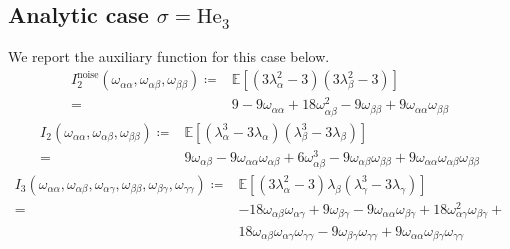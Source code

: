 \subsection{Analytic case \texorpdfstring{$\sigma = \text{He}_3$}{sigma = He3}}
\label{2406:sec:app:theory_H3}
We report the auxiliary function for this case below. 
\[\begin{split}
I^\text{noise}_2(\omega_{\alpha\alpha},\omega_{\alpha\beta},\omega_{\beta\beta}) \coloneqq& \mathbb E \left[(3\lambda_\alpha^2-3)(3\lambda_\beta^2-3)\right] \\
=& 9 - 9\omega_{\alpha\alpha} + 18\omega_{\alpha\beta}^2 - 9\omega_{\beta\beta} + 9\omega_{\alpha\alpha}\omega_{\beta\beta}
\end{split}\]
%
\[\begin{split}
I_2(\omega_{\alpha\alpha},\omega_{\alpha\beta},\omega_{\beta\beta}) \coloneqq& \mathbb E \left[(\lambda_\alpha^3-3\lambda_\alpha)(\lambda_\beta^3-3\lambda_\beta)\right] \\
=& 9\omega_{\alpha\beta} - 9\omega_{\alpha\alpha}\omega_{\alpha\beta} + 6\omega_{\alpha\beta}^3 - 9\omega_{\alpha\beta}\omega_{\beta\beta} + 9\omega_{\alpha\alpha}\omega_{\alpha\beta}\omega_{\beta\beta}
\end{split}\]
%
\begin{equation*}\begin{split}
I_3(\omega_{\alpha\alpha},\omega_{\alpha\beta}, \omega_{\alpha\gamma},\omega_{\beta\beta}, \omega_{\beta\gamma},\omega_{\gamma\gamma}) \coloneqq& \mathbb E \left[(3\lambda_\alpha^2-3)\lambda_\beta(\lambda^3_\gamma-3\lambda_\gamma)\right] \\
=& -18\omega_{\alpha\beta}\omega_{\alpha\gamma} + 9\omega_{\beta\gamma} - 9\omega_{\alpha\alpha}\omega_{\beta\gamma} + 18\omega_{\alpha\gamma}^2\omega_{\beta\gamma} + \\
& 18\omega_{\alpha\beta}\omega_{\alpha\gamma}\omega_{\gamma\gamma} - 9\omega_{\beta\gamma}\omega_{\gamma\gamma} + 9\omega_{\alpha\alpha}\omega_{\beta\gamma}\omega_{\gamma\gamma}
\end{split}\end{equation*}
%
